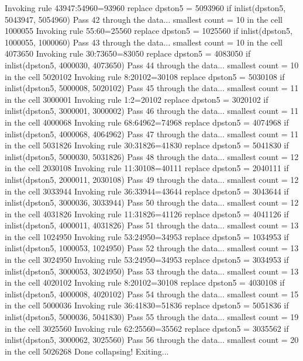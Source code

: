   Invoking rule 43947:54960=93960
  replace dpston5 = 5093960 if inlist(dpston5, 5043947, 5054960)
Pass 42 through the data...
  smallest count = 10 in the cell      1000055
  Invoking rule 55:60=25560
  replace dpston5 = 1025560 if inlist(dpston5, 1000055, 1000060)
Pass 43 through the data...
  smallest count = 10 in the cell      4073650
  Invoking rule 30:73650=83050
  replace dpston5 = 4083050 if inlist(dpston5, 4000030, 4073650)
Pass 44 through the data...
  smallest count = 10 in the cell      5020102
  Invoking rule 8:20102=30108
  replace dpston5 = 5030108 if inlist(dpston5, 5000008, 5020102)
Pass 45 through the data...
  smallest count = 11 in the cell      3000001
  Invoking rule 1:2=20102
  replace dpston5 = 3020102 if inlist(dpston5, 3000001, 3000002)
Pass 46 through the data...
  smallest count = 11 in the cell      4000068
  Invoking rule 68:64962=74968
  replace dpston5 = 4074968 if inlist(dpston5, 4000068, 4064962)
Pass 47 through the data...
  smallest count = 11 in the cell      5031826
  Invoking rule 30:31826=41830
  replace dpston5 = 5041830 if inlist(dpston5, 5000030, 5031826)
Pass 48 through the data...
  smallest count = 12 in the cell      2030108
  Invoking rule 11:30108=40111
  replace dpston5 = 2040111 if inlist(dpston5, 2000011, 2030108)
Pass 49 through the data...
  smallest count = 12 in the cell      3033944
  Invoking rule 36:33944=43644
  replace dpston5 = 3043644 if inlist(dpston5, 3000036, 3033944)
Pass 50 through the data...
  smallest count = 12 in the cell      4031826
  Invoking rule 11:31826=41126
  replace dpston5 = 4041126 if inlist(dpston5, 4000011, 4031826)
Pass 51 through the data...
  smallest count = 13 in the cell      1024950
  Invoking rule 53:24950=34953
  replace dpston5 = 1034953 if inlist(dpston5, 1000053, 1024950)
Pass 52 through the data...
  smallest count = 13 in the cell      3024950
  Invoking rule 53:24950=34953
  replace dpston5 = 3034953 if inlist(dpston5, 3000053, 3024950)
Pass 53 through the data...
  smallest count = 13 in the cell      4020102
  Invoking rule 8:20102=30108
  replace dpston5 = 4030108 if inlist(dpston5, 4000008, 4020102)
Pass 54 through the data...
  smallest count = 15 in the cell      5000036
  Invoking rule 36:41830=51836
  replace dpston5 = 5051836 if inlist(dpston5, 5000036, 5041830)
Pass 55 through the data...
  smallest count = 19 in the cell      3025560
  Invoking rule 62:25560=35562
  replace dpston5 = 3035562 if inlist(dpston5, 3000062, 3025560)
Pass 56 through the data...
  smallest count = 20 in the cell      5026268
  Done collapsing! Exiting...
{\smallskip}
